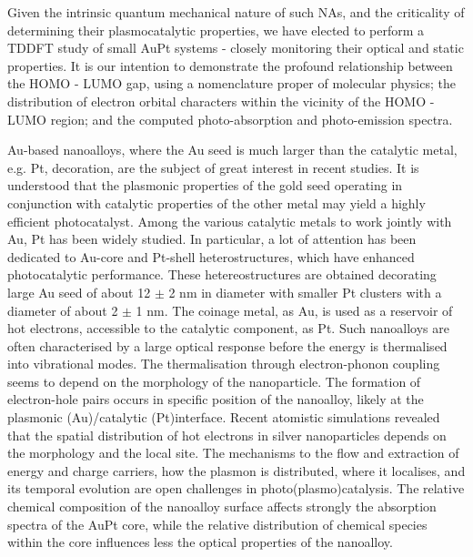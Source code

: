 Given the intrinsic quantum mechanical nature of such NAs, and the criticality of determining their plasmocatalytic properties, we have elected to perform a TDDFT study of small AuPt systems - closely monitoring their optical and static properties. It is our intention to demonstrate the profound relationship between the HOMO - LUMO gap, using a nomenclature proper of molecular physics; the distribution of electron orbital characters within the vicinity of the HOMO - LUMO region; and the computed photo-absorption and photo-emission spectra.
%

Au-based nanoalloys, where the Au seed is much larger than the catalytic metal, e.g. Pt, decoration, are the subject of great interest in recent studies. It is understood that the plasmonic properties of the gold seed operating in conjunction with catalytic properties of the other metal may yield a highly efficient photocatalyst.\cite{Cortes2020,Zhang2019}
Among the various catalytic metals to work jointly with Au, Pt has been widely studied. In particular, a lot of attention has been dedicated to Au-core and Pt-shell heterostructures, which have enhanced photocatalytic performance. \cite{Adzic2013,Xia2017} 
These hetereostructures are obtained decorating large Au seed of about 12 $\pm$ 2 nm in diameter with smaller Pt clusters with a diameter of about 2 $\pm$ 1 nm.\cite{Kunwar2019,Engelbrekt2021,Linic2021,Fagan2021} The coinage metal, as Au, is used as a reservoir of hot electrons, accessible to the catalytic component, as Pt.\cite{Xia2017} Such nanoalloys are often characterised by a large optical response before the energy is thermalised into vibrational modes. The thermalisation through electron-phonon coupling seems to depend on the morphology of the nanoparticle.\cite{Staechelin2021} The formation of electron-hole pairs occurs in specific position of the nanoalloy, likely at the plasmonic (Au)/catalytic (Pt)interface. Recent atomistic simulations revealed that the spatial distribution of hot electrons in silver nanoparticles depends on the morphology and the local site.\cite{TRossi2020}
The mechanisms to the flow and extraction of energy and charge carriers, how the plasmon is distributed, where it localises, and its temporal evolution are open challenges in photo(plasmo)catalysis.\cite{Linic2021} 
%
The relative chemical composition of the nanoalloy surface affects strongly the absorption spectra of the AuPt core\@shell,\cite{Rocha2021} while the relative distribution of chemical species within the core influences less the optical properties of the nanoalloy.\cite{Stener2021}
